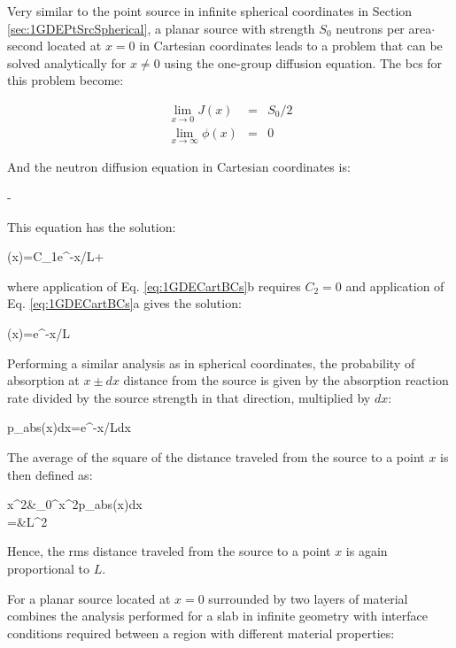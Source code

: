 
Very similar to the point source in infinite spherical coordinates in Section \ref{sec:1GDEPtSrcSpherical}, a planar source with strength \(S_0\) neutrons per area\(\cdot\)second located at \(x=0\) in Cartesian coordinates leads to a problem that can be solved analytically for \(x\neq0\) using the one-group diffusion equation. The \glspl{bc} for this problem become:

\begin{subequations}
\label{eq:1GDECartBCs}
\begin{eqnarray}
\lim_{x\rightarrow0}J(x)&=&S_0/2\\
\lim_{x\rightarrow\infty}\phi(x)&=&0
\end{eqnarray}
\end{subequations}

And the neutron diffusion equation in Cartesian coordinates is:

\beq
{}-
\eeq

This equation has the solution:

\beq
\phi(x)=C_1e^{-x/L}+
\eeq

where application of Eq. \eqref{eq:1GDECartBCs}b requires \(C_2=0\) and application of Eq. \eqref{eq:1GDECartBCs}a gives the solution:

\beq
\phi(x)=e^{-x/L}
\eeq

Performing a similar analysis as in spherical coordinates, the probability of absorption at \(x\pm dx\) distance from the source is given by the absorption reaction rate divided by the source strength in that direction, multiplied by \(dx\):

\beq
p_{abs}(x)dx=e^{-x/L}dx
\eeq

The average of the square of the distance traveled from the source to a point \(x\) is then defined as:

\beqa
\langle x^2\rangle\equiv&\int_0^\infty x^2p_{abs}(x)dx\\
=&L^2
\eeqa

Hence, the \gls{rms} distance traveled from the source to a point \(x\) is again proportional to \(L\).


For a planar source located at \(x=0\) surrounded by two layers of material combines the analysis performed for a slab in infinite geometry with interface conditions required between a region with different material properties:

